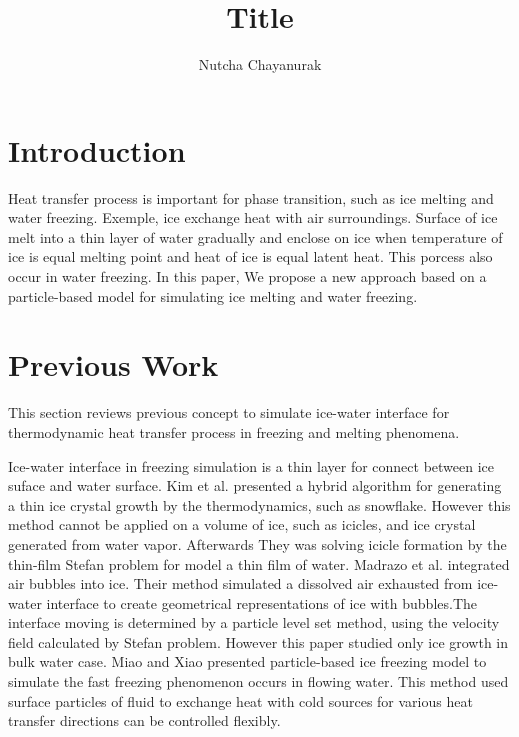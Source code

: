 \documentclass[10pt, twocolumn] {IEEEtran}
\begin{document}
\title{Title}
\author{Nutcha Chayanurak}
\maketitle
\begin{abstract} 
 \end{abstract}
\section{Introduction}
Heat transfer process is important for phase transition, such as ice melting and water freezing. Exemple, ice exchange heat with air surroundings. Surface of ice melt into a thin layer of water  gradually and enclose on ice when temperature of ice is equal melting point and heat of ice is equal latent heat. This porcess also occur in water freezing. In this paper, We propose a new approach based on 
a particle-based model for simulating ice melting and water freezing.
\section{Previous Work}
This section reviews previous concept to simulate ice-water interface for thermodynamic heat transfer process in freezing and melting phenomena. 

Ice-water interface in freezing simulation is a thin layer for connect between ice suface and water surface. Kim et al.\cite{kim2004hybrid} presented a hybrid algorithm for generating a thin ice crystal growth by the thermodynamics, such as snowflake. However this method cannot be applied on a volume of ice, such as icicles, and ice crystal generated from water vapor. Afterwards They was solving icicle formation by the thin-film Stefan problem for model a thin film of water\cite{kim2006modeling}. Madrazo et al. integrated air bubbles into ice\cite{madrazo2009air}. Their method simulated a dissolved air exhausted from ice-water interface to create geometrical representations of ice with bubbles.The interface moving is determined by a particle level set method, using the velocity field calculated by Stefan problem. However this paper studied only ice growth in bulk water case. Miao and Xiao\cite{Miao:2015:PIF:2817675.2817676} presented particle-based ice freezing model to simulate the fast freezing phenomenon occurs in flowing water. This method used surface particles of fluid to exchange heat with cold sources for various heat transfer directions can be controlled flexibly.
 
\end{document}
